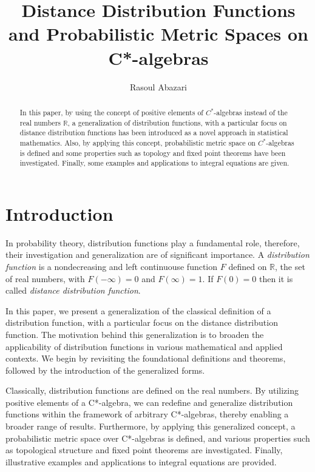 \documentclass{amsart}%
\theoremstyle{plain}
\numberwithin{equation}{section}
\begin{document}
\title[Distance Distribution Functions and Probabilistic Metric Spaces on C*-algebras]{Distance Distribution Functions and Probabilistic Metric Spaces on C*-algebras}
\author{Rasoul Abazari}
\address{Department of Mathematics, Ardabil Branch, Islamic Azad University, Ardabil, Iran.}

\begin{abstract}
In this paper, by using the concept of positive elements of $C^*$-algebras instead of the real numbers $\mathbb{R}$, a generalization of distribution functions, with a particular focus on distance distribution functions has been introduced as a novel approach in statistical mathematics. Also, by applying this concept,  probabilistic metric space on $C^*$-algebras  is defined and some properties such as topology and fixed point theorems have been investigated. Finally, some examples and applications to integral equations are given.
\end{abstract}
\maketitle


\section{Introduction}
In probability theory, distribution functions play a fundamental role, therefore, their investigation and generalization are of significant importance. A {\em distribution function} is a nondecreasing and left continuouse function $F$ defined on $\mathbb{R}$, the set of real numbers, with $F(-\infty)=0$ and $F(\infty)=1$. If $F(0)=0$ then it is called {\em distance distribution function}.

In this paper, we present a generalization of the classical definition of a distribution function, with a particular focus on the distance distribution function. The motivation behind this generalization is to broaden the applicability of distribution functions in various mathematical and applied contexts. We begin by revisiting the foundational definitions and theorems, followed by the introduction of the generalized forms.

Classically, distribution functions are defined on the real numbers. By utilizing positive elements of a C*-algebra, we can redefine and generalize distribution functions within the framework of arbitrary C*-algebras, thereby enabling a broader range of results. 	Furthermore, by applying this generalized concept, a probabilistic metric space over C*-algebras is defined, and various properties such as topological structure and fixed point theorems are investigated. Finally, illustrative examples and applications to integral equations are provided.
\end{document}

